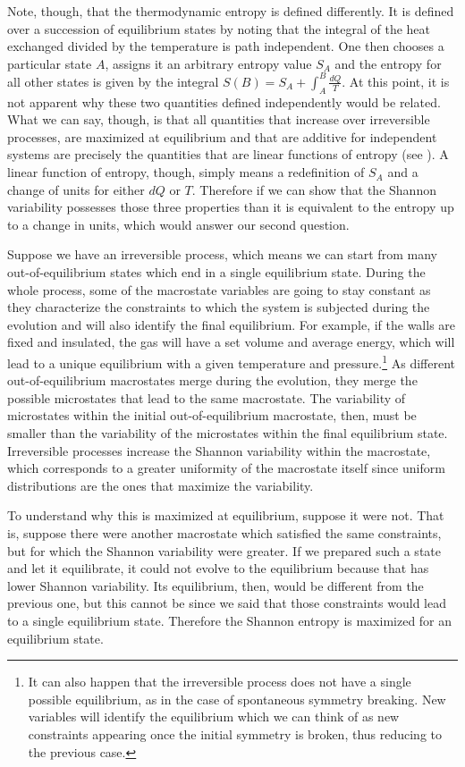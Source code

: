 \documentclass{article}
\begin{document}
Note, though, that the thermodynamic entropy is defined differently. It is defined over a succession of equilibrium states by noting that the integral of the heat exchanged divided by the temperature is path independent. One then chooses a particular state $A$, assigns it an arbitrary entropy value $S_A$ and the entropy for all other states is given by the integral $S(B) = S_A + \int_A^B \frac{dQ}{T}$. At this point, it is not apparent why these two quantities defined independently would be related. What we can say, though, is that all quantities that increase over irreversible processes, are maximized at equilibrium and that are additive for independent systems are precisely the quantities that are linear functions of entropy (see \cite{Giles}). A linear function of entropy, though, simply means a redefinition of $S_A$ and a change of units for either $dQ$ or $T$. Therefore if we can show that the Shannon variability possesses those three properties than it is equivalent to the entropy up to a change in units, which would answer our second question.

Suppose we have an irreversible process, which means we can start from many out-of-equilibrium states which end in a single equilibrium state. During the whole process, some of the macrostate variables are going to stay constant as they characterize the constraints to which the system is subjected during the evolution and will also identify the final equilibrium. For example, if the walls are fixed and insulated, the gas will have a set volume and average energy, which will lead to a unique equilibrium with a given temperature and pressure.\footnote{It can also happen that the irreversible process does not have a single possible equilibrium, as in the case of spontaneous symmetry breaking. New variables will identify the equilibrium which we can think of as new constraints appearing once the initial symmetry is broken, thus reducing to the previous case.} As different out-of-equilibrium macrostates merge during the evolution, they merge the possible microstates that lead to the same macrostate. The variability of microstates within the initial out-of-equilibrium macrostate, then, must be smaller than the variability of the microstates within the final equilibrium state. Irreversible processes increase the Shannon variability within the macrostate, which corresponds to a greater uniformity of the macrostate itself since uniform distributions are the ones that maximize the variability.

To understand why this is maximized at equilibrium, suppose it were not. That is, suppose there were another macrostate which satisfied the same constraints, but for which the Shannon variability were greater. If we prepared such a state and let it equilibrate, it could not evolve to the equilibrium because that has lower Shannon variability. Its equilibrium, then, would be different from the previous one, but this cannot be since we said that those constraints would lead to a single equilibrium state. Therefore the Shannon entropy is maximized for an equilibrium state.
\end{document}
